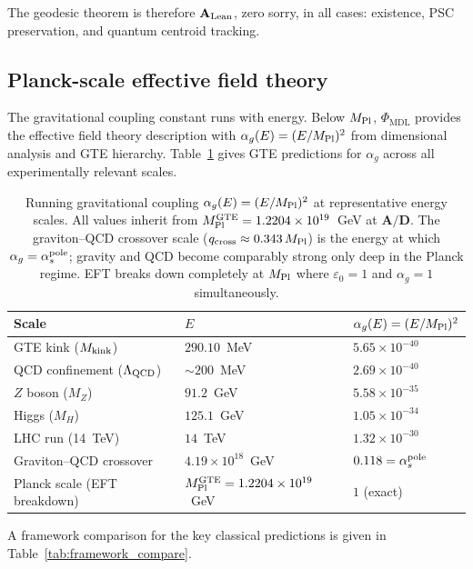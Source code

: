 \documentclass[11pt]{article}
\theoremstyle{remark}
\newcommand{\PHIMDL}{\Phi_{\mathrm{MDL}}}
\newcommand{\epsz}{\varepsilon_0}
\newcommand{\CatAL}{\ensuremath{\textbf{A}_{\rm Lean}}}
\newcommand{\CatAD}{\textbf{A/D}}
\begin{document}
The geodesic theorem is therefore $\CatAL$, zero sorry, in all cases: existence,
PSC preservation, and quantum centroid tracking.

\subsection{Planck-scale effective field theory}
\label{sec:planck_eft}

The gravitational coupling constant runs with energy.  Below $M_{\rm Pl}$,
$\PHIMDL$ provides the effective field theory description with
$\alpha_g(E) = (E/M_{\rm Pl})^2$ from dimensional analysis and GTE hierarchy.
Table~\ref{tab:alpha_running} gives GTE predictions for $\alpha_g$ across
all experimentally relevant scales.

\begin{table}[h]
\small
\centering
\renewcommand{\arraystretch}{1.2}
\begin{tabular}{@{}lll@{}}
\toprule
\textbf{Scale} & $E$ & $\alpha_g(E)=(E/M_{\rm Pl})^2$\\
\midrule
GTE kink ($M_{\rm kink}$) & $290.10$~MeV & $5.65\times10^{-40}$\\
QCD confinement ($\Lambda_{\rm QCD}$) & $\sim200$~MeV & $2.69\times10^{-40}$\\
$Z$ boson ($M_Z$) & $91.2$~GeV & $5.58\times10^{-35}$\\
Higgs ($M_H$) & $125.1$~GeV & $1.05\times10^{-34}$\\
LHC run (14~TeV) & $14$~TeV & $1.32\times10^{-30}$\\
Graviton--QCD crossover & $4.19\times10^{18}$~GeV & $0.118 = \alpha_s^{\rm pole}$\\
Planck scale (EFT breakdown) & $M_{\rm Pl}^{\rm GTE}=1.2204\times10^{19}$~GeV & $1$ (exact)\\
\bottomrule
\end{tabular}
\caption{Running gravitational coupling $\alpha_g(E)=(E/M_{\rm Pl})^2$ at
representative energy scales.  All values inherit from
$M_{\rm Pl}^{\rm GTE}=1.2204\times10^{19}$~GeV at $\CatAD$.
The graviton--QCD crossover scale ($q_{\rm cross}\approx0.343\,M_{\rm Pl}$) is
the energy at which $\alpha_g = \alpha_s^{\rm pole}$; gravity and QCD become
comparably strong only deep in the Planck regime.
EFT breaks down completely at $M_{\rm Pl}$ where $\epsz=1$ and $\alpha_g=1$
simultaneously.}
\label{tab:alpha_running}
\end{table}

A framework comparison for the key classical predictions is given in
Table~\ref{tab:framework_compare}.
\end{document}
